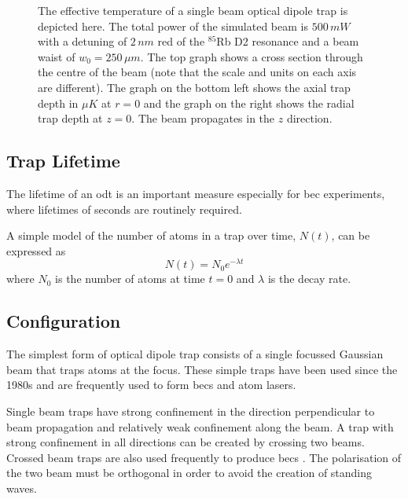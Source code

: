 \begin{figure}[H]
\caption{The effective temperature of a single beam optical dipole trap is depicted here. The total power of the simulated beam is $500\,\unit{mW}$ with a detuning of $2\,\unit{nm}$ red of the $^{85}$Rb D2 resonance and a beam waist of $w_0=250\,\unit{\mu m}$. The top graph shows a cross section through the centre of the beam (note that the scale and units on each axis are different). The graph on the bottom left shows the axial trap depth in $\mu K$ at $r=0$ and the graph on the right shows the radial trap depth at $z=0$. The beam propagates in the $z$ direction.}
\label{fig:dipolepotential}
\end{figure}

\subsection{Trap Lifetime}
\label{lifetime_section}
The lifetime of an \gls{odt} is an important measure especially for \gls{bec} experiments, where lifetimes of seconds are routinely required\cite{cennini_bose-einstein_2003, kuppens_loading_2000, barrett_all-optical_2001}.

A simple model of the number of atoms in a trap over time, $N(t)$, can be expressed as
\begin{equation}
N(t) = N_0 e^{-\lambda t}
\end{equation}
where $N_0$ is the number of atoms at time $t=0$ and $\lambda$ is the decay rate.

\subsection{Configuration}

The simplest form of optical dipole trap consists of a single focussed Gaussian beam that traps atoms at the focus. These simple traps have been used since the 1980s\cite{chu_experimental_1986} and are frequently used to form \glspl{bec} and atom lasers\cite{chikkatur_continuous_2002, kleine_buning_slow_2010, lin_rapid_2009}.

Single beam traps have strong confinement in the direction perpendicular to beam propagation and relatively weak confinement along the beam. A trap with strong confinement in all directions can be created by crossing two beams. Crossed beam traps are also used frequently to produce \glspl{bec} \cite{couvert_quasi-monomode_2008, arnold_all-optical_2011, fu_bose-einstein_2011, barrett_all-optical_2001, xiong_evaporative_2010}. The polarisation of the two beam must be orthogonal in order to avoid the creation of standing waves.\label{odt_polarisation}

